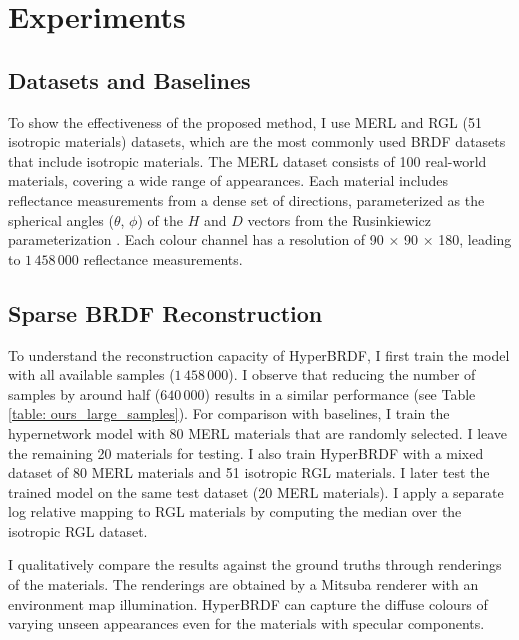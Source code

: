 \section{Experiments}\label{sec:exp}


\subsection{Datasets and Baselines}

To show the effectiveness of the proposed method, I use MERL \cite{Matusik2003jul} and RGL (51 isotropic materials) \cite{dupuy2018adaptive} datasets, which are the most commonly used BRDF datasets that include isotropic materials. The MERL dataset \cite{Matusik2003jul} consists of 100 real-world materials, covering a wide range of appearances. Each material includes reflectance measurements from a dense set of directions, parameterized as the spherical angles ($\theta$, $\phi$) of the $H$ and $D$ vectors from the Rusinkiewicz parameterization \cite{rusinkiewicz1998new}. Each colour channel has a resolution of 90 × 90 × 180, leading to $1\,458\,000$ reflectance measurements. 



\subsection{Sparse BRDF Reconstruction}\label{sec:brdf_rec}

To understand the reconstruction capacity of HyperBRDF, I first train the model with all available samples ($1\,458\,000$). I observe that reducing the number of samples by around half ($640\,000$) results in a similar performance (see Table \ref{table: ours_large_samples}). For comparison with baselines, I train the hypernetwork model with 80 MERL materials that are randomly selected. I leave the remaining 20 materials for testing. I also train HyperBRDF with a mixed dataset of 80 MERL materials and 51 isotropic RGL materials. I later test the trained model on the same test dataset (20 MERL materials). I apply a separate log relative mapping to RGL materials by computing the median over the isotropic RGL dataset.
 
I qualitatively compare the results against the ground truths through renderings of the materials. The renderings are obtained by a Mitsuba renderer with an environment map illumination. HyperBRDF can capture the diffuse colours of varying unseen appearances even for the materials with specular components. 


